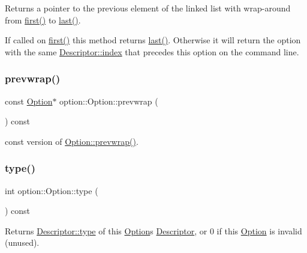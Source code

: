 Returns a pointer to the previous element of the linked list with wrap-\/around from \hyperlink{classoption_1_1_option_abb4e13cd7c90999c8a6b1f871cece283}{first()} to \hyperlink{classoption_1_1_option_afe2aff68191e55b59c53fac3dbbcd7c3}{last()}. 

If called on \hyperlink{classoption_1_1_option_abb4e13cd7c90999c8a6b1f871cece283}{first()} this method returns \hyperlink{classoption_1_1_option_afe2aff68191e55b59c53fac3dbbcd7c3}{last()}. Otherwise it will return the option with the same \hyperlink{structoption_1_1_descriptor_a1fee8ac44f529c99ac2b1149b4c391b1}{Descriptor\+::index} that precedes this option on the command line. \mbox{\label{classoption_1_1_option_a8bf33184c360cd794d9d337c8f8044b3}} 
\subsubsection{\texorpdfstring{prevwrap()}{prevwrap()}\hspace{0.1cm}{\footnotesize\ttfamily [2/2]}}
{\footnotesize\ttfamily const \hyperlink{classoption_1_1_option}{Option}$\ast$ option\+::\+Option\+::prevwrap (\begin{DoxyParamCaption}{ }\end{DoxyParamCaption}) const\hspace{0.3cm}{\ttfamily [inline]}}

const version of \hyperlink{classoption_1_1_option_a1226e45dc2de30f269b2aff1784bbee7}{Option\+::prevwrap()}. \mbox{\label{classoption_1_1_option_a5268a69e1a91137186ab772574296da0}} 
\subsubsection{\texorpdfstring{type()}{type()}}
{\footnotesize\ttfamily int option\+::\+Option\+::type (\begin{DoxyParamCaption}{ }\end{DoxyParamCaption}) const\hspace{0.3cm}{\ttfamily [inline]}}



Returns \hyperlink{structoption_1_1_descriptor_a1b220dabd8aad075fa441a80f9b9343c}{Descriptor\+::type} of this \hyperlink{classoption_1_1_option}{Option}\textquotesingle{}s \hyperlink{structoption_1_1_descriptor}{Descriptor}, or 0 if this \hyperlink{classoption_1_1_option}{Option} is invalid (unused). 

